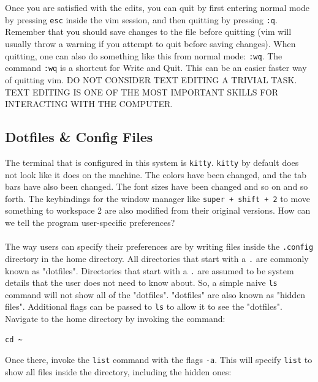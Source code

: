 \documentclass[a4paper, 12pt]{report}
\begin{document}
\begin{center}
\\~\\Once you are satisfied with the edits, you can quit by first entering normal mode by pressing \texttt{esc} inside the vim session, and then quitting by pressing \texttt{:q}. Remember that you should save changes to the file before quitting (vim will usually throw a warning if you attempt to quit before saving changes). When quitting, one can also do something like this from normal mode: \texttt{:wq}. The command \texttt{:wq} is a shortcut for Write and Quit. This can be an easier faster way of quitting vim. DO NOT CONSIDER TEXT EDITING A TRIVIAL TASK. TEXT EDITING IS ONE OF THE MOST IMPORTANT SKILLS FOR INTERACTING WITH THE COMPUTER.

\subsection{Dotfiles \& Config Files}

The terminal that is configured in this system is \texttt{kitty}. \texttt{kitty} by default does not look like it does on the machine. The colors have been changed, and the tab bars have also been changed. The font sizes have been changed and so on and so forth. The keybindings for the window manager like \texttt{super + shift + 2} to move something to workspace 2 are also modified from their original versions. How can we tell the program user-specific preferences? 
\\~\\The way users can specify their preferences are by writing files inside the \texttt{.config} directory in the home directory. All directories that start with a \texttt{.} are commonly known as "dotfiles". Directories that start with a \texttt{.} are assumed to be system details that the user does not need to know about. So, a simple naive \texttt{ls} command will not show all of the "dotfiles". "dotfiles" are also known as "hidden files". Additional flags can be passed to \texttt{ls} to allow it to see the "dotfiles". Navigate to the home directory by invoking the command:
\begin{lstlisting}
cd ~
\end{lstlisting}
Once there, invoke the \texttt{list} command with the flags \texttt{-a}. This will specify \texttt{list} to show all files inside the directory, including the hidden ones:
\begin{lstlisting}

\end{lstlisting}
\end{center}
\end{document}
